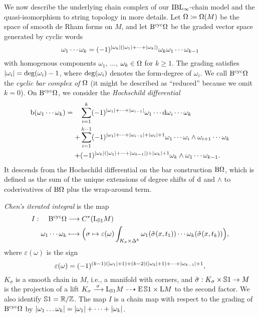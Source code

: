 \documentclass[\MainFolder/Text.tex]{subfiles}
\begin{document}
We now describe the underlying chain complex of our $\mathrm{IBL}_\infty$-chain model and the quasi-isomorphism to string topology in more details.
Let $\Omega\coloneqq\Omega(M)$ be the space of smooth de Rham forms on $M$, and let $\mathrm{B}^{\mathrm{cyc}} \Omega$ be the graded vector space generated by cyclic words 
\[ \omega_1\dotsb\omega_k = (-1)^{|\omega_k|(|\omega_1|+\dotsb+|\omega_k|)} \omega_k\omega_1 \dotsb \omega_{k-1} \]
with homogenous components $\omega_1$, $\dotsc$, $\omega_k \in \Omega$ for $k\ge 1$.
The grading satisfies $|\omega_i| = \operatorname{deg}(\omega_i) - 1$, where $\operatorname{deg}(\omega_i)$ denotes the form-degree of $\omega_i$. 
We call $\mathrm{B}^{\mathrm{cyc}} \Omega$ the \emph{cyclic bar complex of $\Omega$} (it might be described as ``reduced'' because we omit $k=0$).
On $\mathrm{B}^{\mathrm{cyc}} \Omega$, we consider the \emph{Hochschild differential}
\[ \mathrm{b}(\omega_1 \dotsb \omega_k) = \begin{aligned}[t]
&\sum_{i=1}^k (-1)^{|\omega_1| + \dotsb + |\omega_{i-1}|}\omega_1 \dotsb\mathrm{d}\omega_i\dotsb \omega_k \\
+&\sum_{i=1}^{k-1} (-1)^{|\omega_1|+\dotsb + |\omega_{i-1}| + |\omega_i| + 1}\omega_1 \dotsb \omega_i \wedge \omega_{i+1} \dotsb \omega_k\\
+&(-1)^{|\omega_k|(|\omega_1| + \dotsb + |\omega_{k-1}|) + |\omega_k| + 1}\omega_k \wedge \omega_1 \dotsb \omega_{k-1}.
\end{aligned}\]
It descends from the Hochschild differential on the bar construction $\mathrm{B} \Omega$, which is defined as the sum of the unique extensions of degree shifts of $\mathrm{d}$ and $\wedge$ to coderivatives of $\mathrm{B} \Omega$ plus the wrap-around term.

\emph{Chen's iterated integral} is the map
\[ I: \begin{aligned}[t]
    \mathrm{B}^{\mathrm{cyc}} \Omega& \longrightarrow C^*(\mathrm{L}_{\mathbb{S}{1}} M)\\    
    \omega_1 \dotsb \omega_k & \longmapsto  \Bigl(\sigma \mapsto \varepsilon(\omega) \int_{K_\sigma \times \Delta^k} \omega_1(\tilde{\sigma}(x,t_1)) \dotsb \omega_k(\tilde{\sigma}(x,t_k))\Bigr),
   \end{aligned}\]
where $\varepsilon(\omega)$ is the sign
\[ \varepsilon(\omega) = (-1)^{(k-1)(|\omega_1| + 1) + (k-2)(|\omega_2| + 1) + \dotsb + |\omega_{k-1}| + 1}, \]
$K_\sigma$ is a smooth chain in $M$, i.e., a manifold with corners, and $\tilde{\sigma}: K_\sigma\times\mathbb{S}{1} \rightarrow M$ is the projection of a lift $K_\sigma \xrightarrow{\hspace{.2em}\sigma\hspace{.2em}}\mathrm{L}_{\mathbb{S}{1}} M \dasharrow \operatorname{E} \mathbb{S}{1} \times \mathrm{L} M$ to the second factor.
We also identify $\mathbb{S}{1} = \mathbb{R}/\mathbb{Z}$.
The map $I$ is a chain map with respect to the grading of $\mathrm{B}^{\mathrm{cyc}}\Omega$ by $|\omega_1 \dotsc \omega_k| = |\omega_1| + \dotsb + |\omega_k|$.
\end{document}
